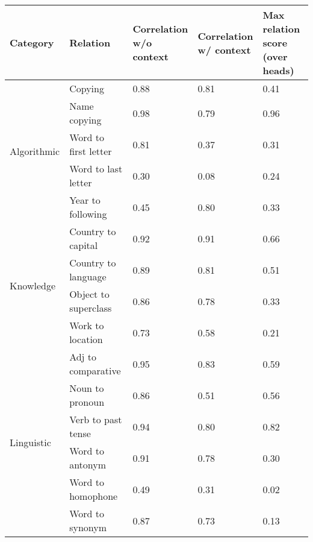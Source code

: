 \begin{tabular}{lllll}
\toprule
Category & Relation & \makecell{Correlation\\w/o context} & \makecell{Correlation\\w/ context} & \makecell{Max relation score\\(over heads)} \\
\midrule
\multirow{5}{*}{Algorithmic} & Copying & 0.88 & 0.81 & 0.41 \\
 & Name copying & 0.98 & 0.79 & 0.96 \\
 & Word to first letter & 0.81 & 0.37 & 0.31 \\
 & Word to last letter & 0.30 & 0.08 & 0.24 \\
 & Year to following & 0.45 & 0.80 & 0.33 \\
\multirow{4}{*}{Knowledge} & Country to capital & 0.92 & 0.91 & 0.66 \\
 & Country to language & 0.89 & 0.81 & 0.51 \\
 & Object to superclass & 0.86 & 0.78 & 0.33 \\
 & Work to location & 0.73 & 0.58 & 0.21 \\
\multirow{6}{*}{Linguistic} & Adj to comparative & 0.95 & 0.83 & 0.59 \\
 & Noun to pronoun & 0.86 & 0.51 & 0.56 \\
 & Verb to past tense & 0.94 & 0.80 & 0.82 \\
 & Word to antonym & 0.91 & 0.78 & 0.30 \\
 & Word to homophone & 0.49 & 0.31 & 0.02 \\
 & Word to synonym & 0.87 & 0.73 & 0.13 \\
\bottomrule
\end{tabular}

